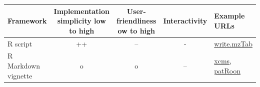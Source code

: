 \documentclass[]{article}
\begin{document}
\begin{longtable}[]{@{}lcccl@{}}
\toprule
\begin{minipage}[b]{0.07\columnwidth}\raggedright
Framework\strut
\end{minipage} & \begin{minipage}[b]{0.12\columnwidth}\centering
Implementation simplicity low to high\strut
\end{minipage} & \begin{minipage}[b]{0.10\columnwidth}\centering
User- friendliness ow to high\strut
\end{minipage} & \begin{minipage}[b]{0.05\columnwidth}\centering
Interactivity\strut
\end{minipage} & \begin{minipage}[b]{0.52\columnwidth}\raggedright
Example URLs\strut
\end{minipage}\tabularnewline
\midrule
\endhead
\begin{minipage}[t]{0.07\columnwidth}\raggedright
R script\strut
\end{minipage} & \begin{minipage}[t]{0.12\columnwidth}\centering
++\strut
\end{minipage} & \begin{minipage}[t]{0.10\columnwidth}\centering
--\strut
\end{minipage} & \begin{minipage}[t]{0.05\columnwidth}\centering
-\strut
\end{minipage} & \begin{minipage}[t]{0.52\columnwidth}\raggedright
\href{https://gist.github.com/sneumann/013004660f1e6c8e34b9}{write.mzTab}\strut
\end{minipage}\tabularnewline
\begin{minipage}[t]{0.07\columnwidth}\raggedright
R Markdown vignette\strut
\end{minipage} & \begin{minipage}[t]{0.12\columnwidth}\centering
o\strut
\end{minipage} & \begin{minipage}[t]{0.10\columnwidth}\centering
o\strut
\end{minipage} & \begin{minipage}[t]{0.05\columnwidth}\centering
--\strut
\end{minipage} & \begin{minipage}[t]{0.52\columnwidth}\raggedright
\href{https://bioconductor.org/packages/release/bioc/vignettes/xcms/inst/doc/xcms.html}{xcms}, \href{https://github.com/rickhelmus/patRoon}{patRoon}\strut

\end{minipage}
\end{longtable}
\end{document}
